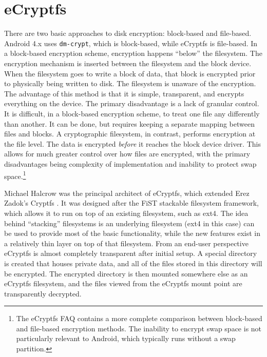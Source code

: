 \section{eCryptfs} 
\label{sec:ecryptfs}
There are two basic approaches to disk encryption: block-based and file-based. Android 4.x uses \texttt{dm-crypt}, which is
block-based, while eCryptfs is file-based.  In a block-based encryption scheme, encryption happens ``below'' the filesystem. The
encryption mechanism is inserted between the filesystem and the block device. When the filesystem goes to write a block of data,
that block is encrypted prior to physically being written to disk. The filesystem is unaware of the encryption. The advantage of
this method is that it is simple, transparent, and encrypts everything on the device. The primary disadvantage is a lack of granular
control. It is difficult, in a block-based encryption scheme, to treat one file any differently than another.  It can be done, but
requires keeping a separate mapping between files and blocks. A cryptographic filesystem, in contrast, performs encryption at the
file level. The data is encrypted \emph{before} it reaches the block device driver. This allows for much greater control over how
files are encrypted, with the primary disadvantages being complexity of implementation and inability to protect swap
space.\footnote{The eCryptfs FAQ contains a more complete comparison between block-based and file-based encryption methods. The
inability to encrypt swap space is not particularly relevant to Android, which typically runs without a swap partition.}

Michael Halcrow was the principal architect of eCryptfs, which extended Erez Zadok's Cryptfs \cite{Halcrow}. It was designed after
the FiST stackable filesystem framework, which allows it to run on top of an existing filesystem, such as ext4. The idea behind
``stacking'' filesystems is an underlying filesystem (ext4 in this case) can be used to provide most of the basic functionality,
while the new features exist in a relatively thin layer on top of that filesystem. From an end-user perspective eCryptfs is almost
completely transparent after initial setup.  A special directory is created that houses private data, and all of the files stored in
this directory will be encrypted. The encrypted directory is then mounted somewhere else as an eCryptfs filesystem, and the files
viewed from the eCryptfs mount point are transparently decrypted. 


